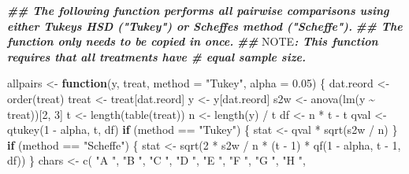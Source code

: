 \documentclass[
]{book}
\newenvironment{Shaded}{\begin{snugshade}}{\end{snugshade}}
\newcommand{\AlertTok}[1]{\textcolor[rgb]{0.94,0.16,0.16}{#1}}
\newcommand{\AttributeTok}[1]{\textcolor[rgb]{0.77,0.63,0.00}{#1}}
\newcommand{\ControlFlowTok}[1]{\textcolor[rgb]{0.13,0.29,0.53}{\textbf{#1}}}
\newcommand{\DecValTok}[1]{\textcolor[rgb]{0.00,0.00,0.81}{#1}}
\newcommand{\DocumentationTok}[1]{\textcolor[rgb]{0.56,0.35,0.01}{\textbf{\textit{#1}}}}
\newcommand{\FloatTok}[1]{\textcolor[rgb]{0.00,0.00,0.81}{#1}}
\newcommand{\FunctionTok}[1]{\textcolor[rgb]{0.00,0.00,0.00}{#1}}
\newcommand{\NormalTok}[1]{#1}
\newcommand{\OtherTok}[1]{\textcolor[rgb]{0.56,0.35,0.01}{#1}}
\newcommand{\SpecialCharTok}[1]{\textcolor[rgb]{0.00,0.00,0.00}{#1}}
\newcommand{\StringTok}[1]{\textcolor[rgb]{0.31,0.60,0.02}{#1}}
\begin{document}
\begin{Shaded}
\begin{Highlighting}[]
\DocumentationTok{\#\# The following function performs all pairwise comparisons using either Tukey\textquotesingle{}s HSD ("Tukey") or Scheffe\textquotesingle{}s method ("Scheffe").}
\DocumentationTok{\#\# The function only needs to be copied in once.}
\DocumentationTok{\#\# }\AlertTok{NOTE}\DocumentationTok{:  This function requires that all treatments have \#  equal sample size.}

\NormalTok{allpairs }\OtherTok{\textless{}{-}} \ControlFlowTok{function}\NormalTok{(y, treat, }\AttributeTok{method =} \StringTok{"Tukey"}\NormalTok{, }\AttributeTok{alpha =} \FloatTok{0.05}\NormalTok{) \{}
\NormalTok{  dat.reord }\OtherTok{\textless{}{-}} \FunctionTok{order}\NormalTok{(treat)}
\NormalTok{  treat }\OtherTok{\textless{}{-}}\NormalTok{ treat[dat.reord]}
\NormalTok{  y }\OtherTok{\textless{}{-}}\NormalTok{ y[dat.reord]}
\NormalTok{  s2w }\OtherTok{\textless{}{-}} \FunctionTok{anova}\NormalTok{(}\FunctionTok{lm}\NormalTok{(y }\SpecialCharTok{\textasciitilde{}}\NormalTok{ treat))[}\DecValTok{2}\NormalTok{, }\DecValTok{3}\NormalTok{]}
\NormalTok{  t }\OtherTok{\textless{}{-}} \FunctionTok{length}\NormalTok{(}\FunctionTok{table}\NormalTok{(treat))}
\NormalTok{  n }\OtherTok{\textless{}{-}} \FunctionTok{length}\NormalTok{(y) }\SpecialCharTok{/}\NormalTok{ t}
\NormalTok{  df }\OtherTok{\textless{}{-}}\NormalTok{ n }\SpecialCharTok{*}\NormalTok{ t }\SpecialCharTok{{-}}\NormalTok{ t}
\NormalTok{  qval }\OtherTok{\textless{}{-}} \FunctionTok{qtukey}\NormalTok{(}\DecValTok{1} \SpecialCharTok{{-}}\NormalTok{ alpha, t, df)}
  \ControlFlowTok{if}\NormalTok{ (method }\SpecialCharTok{==} \StringTok{"Tukey"}\NormalTok{) \{}
\NormalTok{    stat }\OtherTok{\textless{}{-}}\NormalTok{ qval }\SpecialCharTok{*} \FunctionTok{sqrt}\NormalTok{(s2w }\SpecialCharTok{/}\NormalTok{ n)}
\NormalTok{  \}}
  \ControlFlowTok{if}\NormalTok{ (method }\SpecialCharTok{==} \StringTok{"Scheffe"}\NormalTok{) \{}
\NormalTok{    stat }\OtherTok{\textless{}{-}}
      \FunctionTok{sqrt}\NormalTok{(}\DecValTok{2} \SpecialCharTok{*}\NormalTok{ s2w }\SpecialCharTok{/}\NormalTok{ n }\SpecialCharTok{*}\NormalTok{ (t }\SpecialCharTok{{-}} \DecValTok{1}\NormalTok{) }\SpecialCharTok{*} \FunctionTok{qf}\NormalTok{(}\DecValTok{1} \SpecialCharTok{{-}}\NormalTok{ alpha, t }\SpecialCharTok{{-}} \DecValTok{1}\NormalTok{, df))}
\NormalTok{  \}}
\NormalTok{  chars }\OtherTok{\textless{}{-}} \FunctionTok{c}\NormalTok{(}
    \StringTok{"A "}\NormalTok{, }\StringTok{"B "}\NormalTok{, }\StringTok{"C "}\NormalTok{, }\StringTok{"D "}\NormalTok{, }\StringTok{"E "}\NormalTok{, }\StringTok{"F "}\NormalTok{, }\StringTok{"G "}\NormalTok{, }\StringTok{"H "}\NormalTok{,}

\end{Highlighting}
\end{Shaded}
\end{document}
